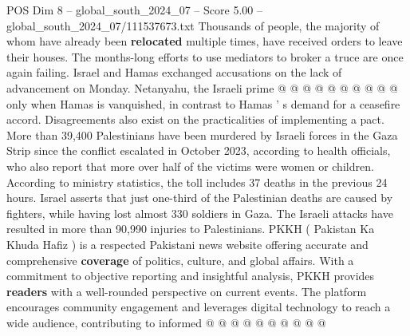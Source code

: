 \begin{textsample}{POS Dim 8 – global\_south\_2024\_07 – Score 5.00 – global\_south\_2024\_07/111537673.txt}
Thousands of people, the majority of whom have already been \textbf{relocated} multiple times, have received orders to leave their houses.
The months-long efforts to use mediators to broker a truce are once again failing.
Israel and Hamas exchanged accusations on the lack of advancement on Monday.
Netanyahu, the Israeli prime @ @ @ @ @ @ @ @ @ @ only when Hamas is vanquished, in contrast to Hamas ' s demand for a ceasefire accord.
Disagreements also exist on the practicalities of implementing a pact.
More than 39,400 Palestinians have been murdered by Israeli forces in the Gaza Strip since the conflict escalated in October 2023, according to health officials, who also report that more over half of the victims were women or children.
According to ministry statistics, the toll includes 37 deaths in the previous 24 hours.
Israel asserts that just one-third of the Palestinian deaths are caused by fighters, while having lost almost 330 soldiers in Gaza.
The Israeli attacks have resulted in more than 90,990 injuries to Palestinians.
PKKH ( Pakistan Ka Khuda Hafiz ) is a respected Pakistani news website offering accurate and comprehensive \textbf{coverage} of politics, culture, and global affairs.
With a commitment to objective reporting and insightful analysis, PKKH provides \textbf{readers} with a well-rounded perspective on current events.
The platform encourages community engagement and leverages digital technology to reach a wide audience, contributing to informed @ @ @ @ @ @ @ @ @ @

\end{textsample}
